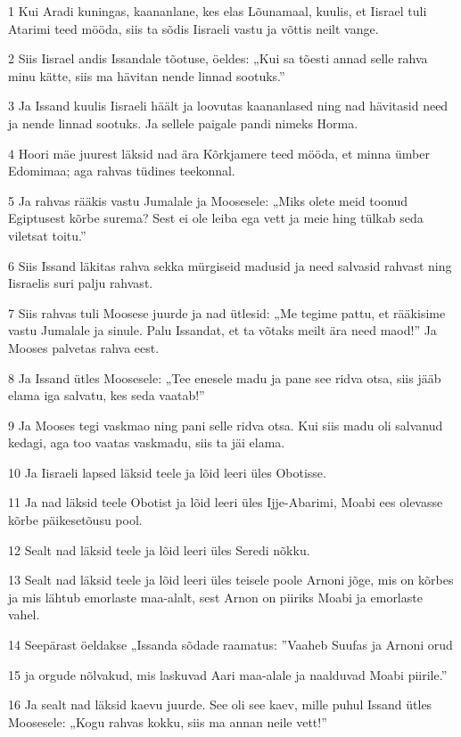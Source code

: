 \par 1 Kui Aradi kuningas, kaananlane, kes elas Lõunamaal, kuulis, et Iisrael tuli Atarimi teed mööda, siis ta sõdis Iisraeli vastu ja võttis neilt vange.
\par 2 Siis Iisrael andis Issandale tõotuse, öeldes: „Kui sa tõesti annad selle rahva minu kätte, siis ma hävitan nende linnad sootuks.”
\par 3 Ja Issand kuulis Iisraeli häält ja loovutas kaananlased ning nad hävitasid need ja nende linnad sootuks. Ja sellele paigale pandi nimeks Horma.
\par 4 Hoori mäe juurest läksid nad ära Kõrkjamere teed mööda, et minna ümber Edomimaa; aga rahvas tüdines teekonnal.
\par 5 Ja rahvas rääkis vastu Jumalale ja Moosesele: „Miks olete meid toonud Egiptusest kõrbe surema? Sest ei ole leiba ega vett ja meie hing tülkab seda viletsat toitu.”
\par 6 Siis Issand läkitas rahva sekka mürgiseid madusid ja need salvasid rahvast ning Iisraelis suri palju rahvast.
\par 7 Siis rahvas tuli Moosese juurde ja nad ütlesid: „Me tegime pattu, et rääkisime vastu Jumalale ja sinule. Palu Issandat, et ta võtaks meilt ära need maod!” Ja Mooses palvetas rahva eest.
\par 8 Ja Issand ütles Moosesele: „Tee enesele madu ja pane see ridva otsa, siis jääb elama iga salvatu, kes seda vaatab!”
\par 9 Ja Mooses tegi vaskmao ning pani selle ridva otsa. Kui siis madu oli salvanud kedagi, aga too vaatas vaskmadu, siis ta jäi elama.
\par 10 Ja Iisraeli lapsed läksid teele ja lõid leeri üles Obotisse.
\par 11 Ja nad läksid teele Obotist ja lõid leeri üles Ijje-Abarimi, Moabi ees olevasse kõrbe päikesetõusu pool.
\par 12 Sealt nad läksid teele ja lõid leeri üles Seredi nõkku.
\par 13 Sealt nad läksid teele ja lõid leeri üles teisele poole Arnoni jõge, mis on kõrbes ja mis lähtub emorlaste maa-alalt, sest Arnon on piiriks Moabi ja emorlaste vahel.
\par 14 Seepärast öeldakse „Issanda sõdade raamatus: ”Vaaheb Suufas ja Arnoni orud
\par 15 ja orgude nõlvakud, mis laskuvad Aari maa-alale ja naalduvad Moabi piirile.”
\par 16 Ja sealt nad läksid kaevu juurde. See oli see kaev, mille puhul Issand ütles Moosesele: „Kogu rahvas kokku, siis ma annan neile vett!”

